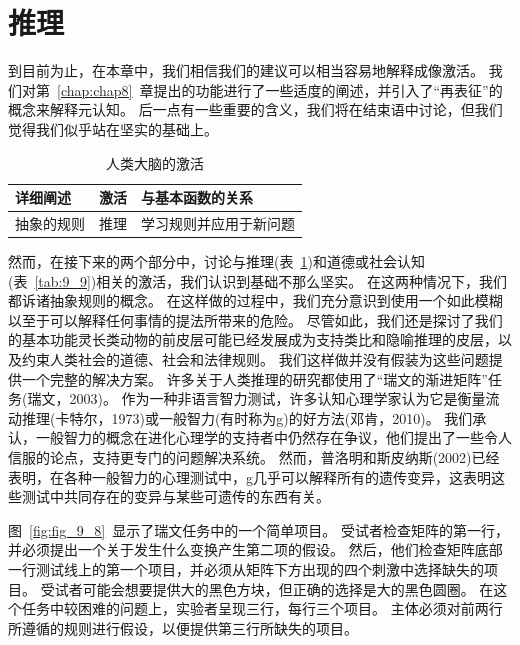 \section{推理}

到目前为止，在本章中，我们相信我们的建议可以相当容易地解释成像激活。
我们对第~\ref{chap:chap8}~章提出的功能进行了一些适度的阐述，并引入了“再表征”的概念来解释元认知。
后一点有一些重要的含义，我们将在结束语中讨论，但我们觉得我们似乎站在坚实的基础上。



\par
\begin{table}[htbp] 
	\newcommand{\tabincell}[2]{\begin{tabular}{@{}#1@{}}#2\end{tabular}} %
	\centering
	\caption{人类大脑的激活\label{tab:9_8}}
	\renewcommand\arraystretch{1.5}	%
	\begin{tabular}{lll}
		\toprule
		详细阐述 & 激活 & 与基本函数的关系\\
		\midrule
		抽象的规则 & 推理 & 学习规则并应用于新问题  \\
		
		\bottomrule
		
	\end{tabular}%
\end{table}%


然而，在接下来的两个部分中，讨论与推理(表~\ref{tab:9_8})和道德或社会认知(表~\ref{tab:9_9})相关的激活，我们认识到基础不那么坚实。
在这两种情况下，我们都诉诸抽象规则的概念。
在这样做的过程中，我们充分意识到使用一个如此模糊以至于可以解释任何事情的提法所带来的危险。
尽管如此，我们还是探讨了我们的基本功能灵长类动物的前皮层可能已经发展成为支持类比和隐喻推理的皮层，以及约束人类社会的道德、社会和法律规则。
我们这样做并没有假装为这些问题提供一个完整的解决方案。
许多关于人类推理的研究都使用了“瑞文的渐进矩阵”任务(瑞文，2003)。
作为一种非语言智力测试，许多认知心理学家认为它是衡量流动推理(卡特尔，1973)或一般智力(有时称为g)的好方法(邓肯，2010)。
我们承认，一般智力的概念在进化心理学的支持者中仍然存在争议，他们提出了一些令人信服的论点，支持更专门的问题解决系统。
然而，普洛明和斯皮纳斯(2002)已经表明，在各种一般智力的心理测试中，g几乎可以解释所有的遗传变异，这表明这些测试中共同存在的变异与某些可遗传的东西有关。


图~\ref{fig:fig_9_8}~显示了瑞文任务中的一个简单项目。
受试者检查矩阵的第一行，并必须提出一个关于发生什么变换产生第二项的假设。
然后，他们检查矩阵底部一行测试线上的第一个项目，并必须从矩阵下方出现的四个刺激中选择缺失的项目。
受试者可能会想要提供大的黑色方块，但正确的选择是大的黑色圆圈。
在这个任务中较困难的问题上，实验者呈现三行，每行三个项目。
主体必须对前两行所遵循的规则进行假设，以便提供第三行所缺失的项目。



